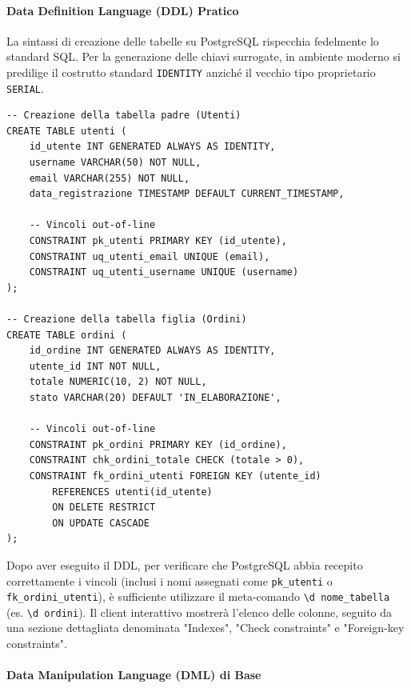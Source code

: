 \paragraph{Data Definition Language (DDL) Pratico}

La sintassi di creazione delle tabelle su PostgreSQL rispecchia fedelmente lo standard SQL. Per la generazione delle chiavi surrogate, in ambiente moderno si predilige il costrutto standard \texttt{IDENTITY} anziché il vecchio tipo proprietario \texttt{SERIAL}.

\begin{lstlisting}[language=PostgreSQL, title=DDL: Creazione di Tabelle Relazionate]
-- Creazione della tabella padre (Utenti)
CREATE TABLE utenti (
    id_utente INT GENERATED ALWAYS AS IDENTITY,
    username VARCHAR(50) NOT NULL,
    email VARCHAR(255) NOT NULL,
    data_registrazione TIMESTAMP DEFAULT CURRENT_TIMESTAMP,

    -- Vincoli out-of-line
    CONSTRAINT pk_utenti PRIMARY KEY (id_utente),
    CONSTRAINT uq_utenti_email UNIQUE (email),
    CONSTRAINT uq_utenti_username UNIQUE (username)
);

-- Creazione della tabella figlia (Ordini)
CREATE TABLE ordini (
    id_ordine INT GENERATED ALWAYS AS IDENTITY,
    utente_id INT NOT NULL,
    totale NUMERIC(10, 2) NOT NULL,
    stato VARCHAR(20) DEFAULT 'IN_ELABORAZIONE',

    -- Vincoli out-of-line
    CONSTRAINT pk_ordini PRIMARY KEY (id_ordine),
    CONSTRAINT chk_ordini_totale CHECK (totale > 0),
    CONSTRAINT fk_ordini_utenti FOREIGN KEY (utente_id) 
        REFERENCES utenti(id_utente)
        ON DELETE RESTRICT
        ON UPDATE CASCADE
);
\end{lstlisting}

\begin{tip}
Dopo aver eseguito il DDL, per verificare che PostgreSQL abbia recepito correttamente i vincoli (inclusi i nomi assegnati come \texttt{pk\_utenti} o \texttt{fk\_ordini\_utenti}), è sufficiente utilizzare il meta-comando \texttt{\textbackslash d nome\_tabella} (es. \texttt{\textbackslash d ordini}). Il client interattivo mostrerà l'elenco delle colonne, seguito da una sezione dettagliata denominata "Indexes", "Check constraints" e "Foreign-key constraints".
\end{tip}

\paragraph{Data Manipulation Language (DML) di Base}

